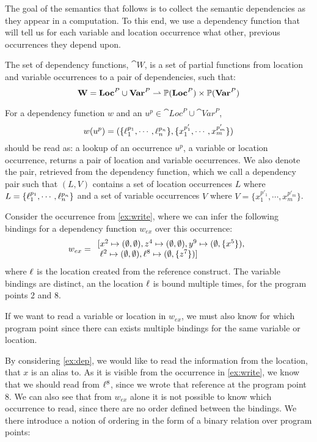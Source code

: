 \documentclass[acmsmall,sigplan]{acmart}
\begin{document}
The goal of the semantics that follows is to collect the semantic
dependencies as they appear in a computation. To this end, we use a
dependency function that will tell us for each variable and location
occurrence what other, previous occurrences they depend upon.

\begin{definition}\label{def:DepFunc}
	The set of dependency functions, $\cat{W}$, is a set of partial functions from location and variable occurrences to a pair of dependencies, such that:
\[
  \textbf{W}=\textbf{Loc}^P\cup\textbf{Var}^P\rightharpoonup\mathbb{P}(\textbf{Loc}^P)\times\mathbb{P}(\textbf{Var}^P) \] 
\end{definition}
For a dependency function $w$ and an
$u^p\in\cat{Loc}^P\cup\cat{Var}^P$,
%
\[ w (u^p)=(\{\ell_1^{p_1},\cdots,\ell_n^{p_n}\},\{x_1^{p'_1},\cdots,x_m^{p'_m}\}) \]
%
should be read as: a lookup of an occurrence $u^p$, a variable or
location occurrence, returns a pair of location and variable
occurrences.  We also denote the pair, retrieved from the dependency
function, which we call a dependency pair such that $(L,V)$ contains a
set of location occurrences $L$ where
$L=\{\ell_1^{p_1},\cdots,\ell_n^{p_n}\}$ and a set of variable
occurrences $V$ where $V=\{x_1^{p'_1},\cdots,x_m^{p'_m}\}$.

\begin{example}[]\label{ex:dep}
	Consider the occurrence from \cref{ex:write}, where we can
        infer the following bindings for a dependency function
        $w_{ex}$ over this occurrence: 
	\[
          w_{ex}= \begin{array}{l}
                    [x^2\mapsto(\emptyset,\emptyset),z^4\mapsto(\emptyset,\emptyset),y^9\mapsto(\emptyset,\{x^5\}),
                    \\ \; \ell^2\mapsto(\emptyset,\emptyset),\ell^8\mapsto(\emptyset,\{z^7\})] \end{array} \]
	where $\ell$ is the location created from the reference construct.
	The variable bindings are distinct, an the location $\ell$ is
        bound multiple times, for the program points $2$ and $8$. 

	If we want to read a variable or location in $w_{ex}$, we must
        also know for which program point since there can exists
        multiple bindings for the same variable or location. 
\end{example}

By considering \cref{ex:dep}, we would like to read the information from the location, that $x$ is an alias to.
As it is visible from the occurrence in \cref{ex:write}, we know that we should read from $\ell^8$, since we wrote that reference at the program point $8$.
We can also see that from $w_{ex}$ alone it is not possible to know which occurrence to read, since there are no order defined between the bindings.
We there introduce a notion of ordering in the form of a binary relation over program points:
\end{document}
